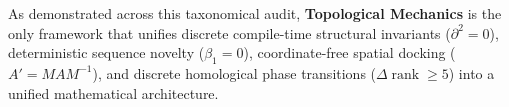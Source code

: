 As demonstrated across this taxonomical audit, \textbf{Topological Mechanics} is the only framework that unifies discrete compile-time structural invariants ($\partial^2 = 0$), deterministic sequence novelty ($\beta_1 = 0$), coordinate-free spatial docking ($A' = M A M^{-1}$), and discrete homological phase transitions ($\Delta\operatorname{rank} \ge 5$) into a unified mathematical architecture.
